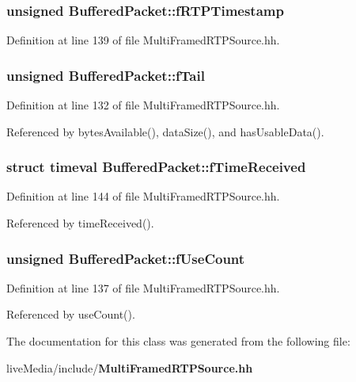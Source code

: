 \subsubsection[{f\+R\+T\+P\+Timestamp}]{\setlength{\rightskip}{0pt plus 5cm}unsigned Buffered\+Packet\+::f\+R\+T\+P\+Timestamp\hspace{0.3cm}{\ttfamily [private]}}\label{classBufferedPacket_a1154bec11066565700b7d9cf1f4ebf1c}


Definition at line 139 of file Multi\+Framed\+R\+T\+P\+Source.\+hh.

\subsubsection[{f\+Tail}]{\setlength{\rightskip}{0pt plus 5cm}unsigned Buffered\+Packet\+::f\+Tail\hspace{0.3cm}{\ttfamily [protected]}}\label{classBufferedPacket_a38069f3ce011f07cf33bbb2a1f124e88}


Definition at line 132 of file Multi\+Framed\+R\+T\+P\+Source.\+hh.



Referenced by bytes\+Available(), data\+Size(), and has\+Usable\+Data().

\subsubsection[{f\+Time\+Received}]{\setlength{\rightskip}{0pt plus 5cm}struct timeval Buffered\+Packet\+::f\+Time\+Received\hspace{0.3cm}{\ttfamily [private]}}\label{classBufferedPacket_a90f8fc902c35de35f29a0e44d87d5061}


Definition at line 144 of file Multi\+Framed\+R\+T\+P\+Source.\+hh.



Referenced by time\+Received().

\subsubsection[{f\+Use\+Count}]{\setlength{\rightskip}{0pt plus 5cm}unsigned Buffered\+Packet\+::f\+Use\+Count\hspace{0.3cm}{\ttfamily [private]}}\label{classBufferedPacket_a941bf549cb24168779e5dab40cdb51b7}


Definition at line 137 of file Multi\+Framed\+R\+T\+P\+Source.\+hh.



Referenced by use\+Count().



The documentation for this class was generated from the following file\+:\begin{DoxyCompactItemize}
\item 
live\+Media/include/{\bf Multi\+Framed\+R\+T\+P\+Source.\+hh}\end{DoxyCompactItemize}
